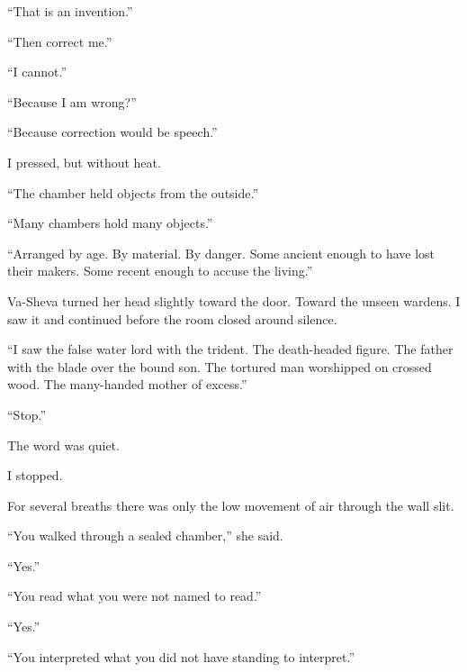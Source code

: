 ``That is an invention.''\par

``Then correct me.''\par

``I cannot.''\par

``Because I am wrong?''\par

``Because correction would be speech.''\par

I pressed, but without heat.\par

``The chamber held objects from the outside.''\par

``Many chambers hold many objects.''\par

``Arranged by age. By material. By danger. Some ancient enough to have lost their makers. Some recent enough to accuse the living.''\par

Va-Sheva turned her head slightly toward the door. Toward the unseen wardens. I saw it and continued before the room closed around silence.\par

``I saw the false water lord with the trident. The death-headed figure. The father with the blade over the bound son. The tortured man worshipped on crossed wood. The many-handed mother of excess.''\par

``Stop.''\par

The word was quiet.\par

I stopped.\par

For several breaths there was only the low movement of air through the wall slit.\par

``You walked through a sealed chamber,'' she said.\par

``Yes.''\par

``You read what you were not named to read.''\par

``Yes.''\par

``You interpreted what you did not have standing to interpret.''\par

